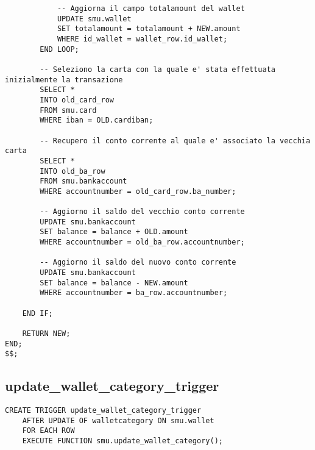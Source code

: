 \begin{lstlisting}
            -- Aggiorna il campo totalamount del wallet
            UPDATE smu.wallet
            SET totalamount = totalamount + NEW.amount
            WHERE id_wallet = wallet_row.id_wallet;
        END LOOP;        

        -- Seleziono la carta con la quale e' stata effettuata inizialmente la transazione
        SELECT *
        INTO old_card_row
        FROM smu.card
        WHERE iban = OLD.cardiban;

        -- Recupero il conto corrente al quale e' associato la vecchia carta
        SELECT *
        INTO old_ba_row
        FROM smu.bankaccount
        WHERE accountnumber = old_card_row.ba_number;

        -- Aggiorno il saldo del vecchio conto corrente
        UPDATE smu.bankaccount
        SET balance = balance + OLD.amount
        WHERE accountnumber = old_ba_row.accountnumber;

        -- Aggiorno il saldo del nuovo conto corrente
        UPDATE smu.bankaccount
        SET balance = balance - NEW.amount
        WHERE accountnumber = ba_row.accountnumber;

    END IF;

    RETURN NEW;
END;
$$;
\end{lstlisting}

\newpage

\subsection{update\_wallet\_category\_trigger}

\begin{lstlisting}
CREATE TRIGGER update_wallet_category_trigger
    AFTER UPDATE OF walletcategory ON smu.wallet
    FOR EACH ROW
    EXECUTE FUNCTION smu.update_wallet_category();
\end{lstlisting}

